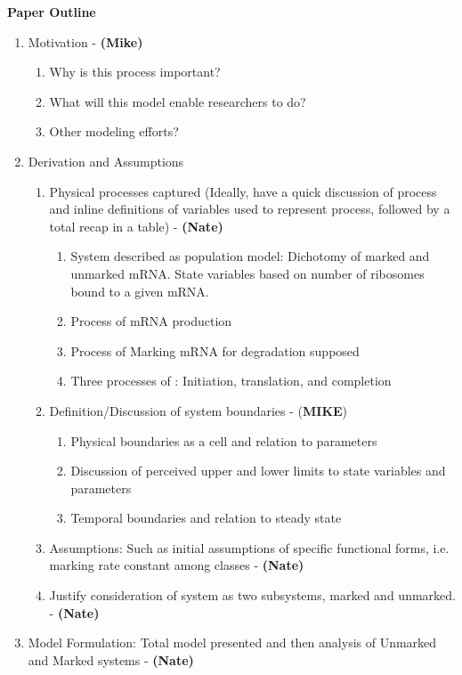 \documentclass[review]{elsarticle}
\begin{document}
\textbf{Paper Outline}
\begin{enumerate}
\item Motivation - \textbf{(Mike)}
\begin{enumerate}
\item Why is this process important?
\item What will this model enable researchers to do?
\item Other modeling efforts?
\end{enumerate}
\item Derivation and Assumptions
\begin{enumerate}
\item Physical processes captured (Ideally, have a quick discussion of process and inline definitions of variables used to represent process, followed by a total recap in a table)  - \textbf{(Nate)}
\begin{enumerate}
\item System described as population model: Dichotomy of marked and unmarked mRNA.
State variables based on number of ribosomes bound to a given mRNA. 
\item Process of mRNA production
\item Process of Marking mRNA for degradation supposed
\item Three processes of : Initiation, translation, and completion
\end{enumerate}
\item Definition/Discussion of system boundaries - (\textbf{MIKE})
\begin{enumerate}
\item Physical boundaries as a cell and relation to parameters
\item Discussion of perceived upper and lower limits to state variables and parameters
\item Temporal boundaries and relation to steady state
\end{enumerate}
\item Assumptions: Such as initial assumptions of specific functional forms, i.e. marking rate constant among classes  - \textbf{(Nate)}
\item Justify consideration of system as two subsystems, marked and unmarked.  - \textbf{(Nate)}
\end{enumerate}
\item Model Formulation: Total model presented and then analysis of Unmarked and Marked systems  - \textbf{(Nate)}

\end{enumerate}
\end{document}
